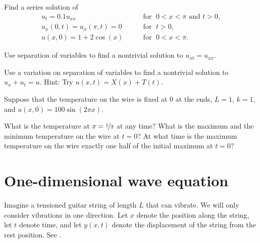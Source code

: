 \begin{exercise}
Find a series solution of
\begin{equation*}
\begin{array}{ll}
u_t =  0.1 u_{xx} & \qquad \text{for } \; 0 < x < \pi \text{ and } t > 0, \\
u_x(0,t) = u_x(\pi,t) = 0 &  \qquad \text{for } \; t > 0, \\
u(x,0) = 1 + 2\cos (x) & \qquad \text{for } \; 0 < x < \pi .
\end{array}
\end{equation*}
\end{exercise}

\begin{exercise}
Use separation of variables to find a nontrivial solution to
$u_{xt} = u_{xx}$.
\end{exercise}

\begin{exercise}
Use a variation on separation of variables 
to find a nontrivial solution to
$u_{x} + u_{t} = u$.  Hint: Try $u(x,t) = X(x)+T(t)$.
\end{exercise}

\begin{exercise}
Suppose that the temperature on the wire is fixed at $0$
at the ends, $L=1$, $k=1$, and $u(x,0) = 100\sin(2 \pi x)$.
\begin{tasks}
\task
What is the temperature at $x = \nicefrac{1}{2}$ at any time?
\task
What is the maximum and the minimum temperature on the wire
at $t=0$?
\task
At what time is the maximum temperature on the wire exactly
one half of the initial maximum at $t=0$?
\end{tasks}
\end{exercise}


\sectionnewpage
\section{One-dimensional wave equation} \label{we:section}


Imagine a tensioned guitar string of length $L$ that can vibrate.
We will only consider vibrations in one direction.  Let
$x$ denote the position along the string, let $t$ denote time,
and let $y(x,t)$
denote the displacement of the string from the rest position.
See
.

